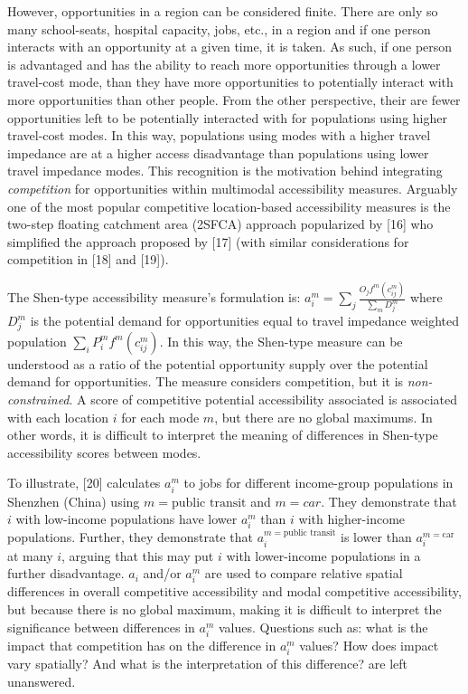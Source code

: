 \documentclass[10pt,letterpaper]{article}
\begin{document}
However, opportunities in a region can be considered finite. There are
only so many school-seats, hospital capacity, jobs, etc., in a region
and if one person interacts with an opportunity at a given time, it is
taken. As such, if one person is advantaged and has the ability to reach
more opportunities through a lower travel-cost mode, than they have more
opportunities to potentially interact with more opportunities than other
people. From the other perspective, their are fewer opportunities left
to be potentially interacted with for populations using higher
travel-cost modes. In this way, populations using modes with a higher
travel impedance are at a higher access disadvantage than populations
using lower travel impedance modes. This recognition is the motivation
behind integrating \emph{competition} for opportunities within
multimodal accessibility measures. Arguably one of the most popular
competitive location-based accessibility measures is the two-step
floating catchment area (2SFCA) approach popularized by {[}16{]} who
simplified the approach proposed by {[}17{]} (with similar
considerations for competition in {[}18{]} and {[}19{]}).

The Shen-type accessibility measure's formulation is:
\(a_i^m = \sum_j \frac{O_jf^m(c_{ij}^m)}{\sum_m D_j^m}\) where \(D_j^m\)
is the potential demand for opportunities equal to travel impedance
weighted population \(\sum_i P_i^m f^m(c_{ij}^m)\). In this way, the
Shen-type measure can be understood as a ratio of the potential
opportunity supply over the potential demand for opportunities. The
measure considers competition, but it is \emph{non-constrained}. A score
of competitive potential accessibility associated is associated with
each location \(i\) for each mode \(m\), but there are no global
maximums. In other words, it is difficult to interpret the meaning of
differences in Shen-type accessibility scores between modes.

To illustrate, {[}20{]} calculates \(a_i^m\) to jobs for different
income-group populations in Shenzhen (China) using
\(m = \text{public transit}\) and \(m={car}\). They demonstrate that
\(i\) with low-income populations have lower \(a_i^m\) than \(i\) with
higher-income populations. Further, they demonstrate that
\(a_i^{m=\text{public transit}}\) is lower than \(a_i^{m=\text{car}}\)
at many \(i\), arguing that this may put \(i\) with lower-income
populations in a further disadvantage. \(a_i\) and/or \(a_i^m\) are used
to compare relative spatial differences in overall competitive
accessibility and modal competitive accessibility, but because there is
no global maximum, making it is difficult to interpret the significance
between differences in \(a_i^{m}\) values. Questions such as: what is
the impact that competition has on the difference in \(a_i^m\) values?
How does impact vary spatially? And what is the interpretation of this
difference? are left unanswered.
\end{document}
